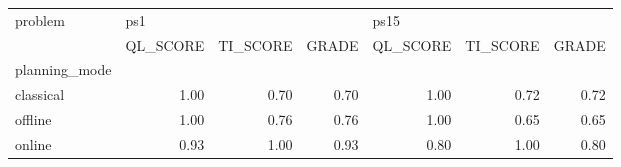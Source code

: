 \begin{tabular}{lrrrrrr}
\toprule
problem & \multicolumn{3}{l}{ps1} & \multicolumn{3}{l}{ps15} \\
{} & QL\_SCORE & TI\_SCORE & GRADE & QL\_SCORE & TI\_SCORE & GRADE \\
planning\_mode &          &          &       &          &          &       \\
\midrule
classical     &     1.00 &     0.70 &  0.70 &     1.00 &     0.72 &  0.72 \\
offline       &     1.00 &     0.76 &  0.76 &     1.00 &     0.65 &  0.65 \\
online        &     0.93 &     1.00 &  0.93 &     0.80 &     1.00 &  0.80 \\
\bottomrule
\end{tabular}
